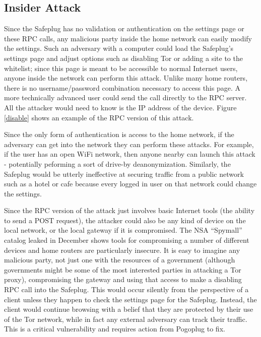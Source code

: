 \documentclass[conference]{IEEEtran}
\begin{document}
\subsection{Insider Attack}
Since the Safeplug has no validation or authentication on the settings page or these RPC calls, any malicious party inside the home network can easily modify the settings.  Such an adversary with a computer could load the Safeplug's settings page and adjust options such as disabling Tor or adding a site to the whitelist; since this page is meant to be accessible to normal Internet users, anyone inside the network can perform this attack.  Unlike many home routers, there is no username/password combination necessary to access this page.  A more technically advanced user could send the call directly to the RPC server.  All the attacker would need to know is the IP address of the device.  Figure \ref{disable} shows an example of the RPC version of this attack.

Since the only form of authentication is access to the home network, if the adversary can get into the network they can perform these attacks.  For example, if the user has an open WiFi network, then anyone nearby can launch this attack - potentially peforming a sort of drive-by deanonymization.  Similarly, the Safeplug would be utterly ineffective at securing traffic from a public network such as a hotel or cafe because every logged in user on that network could change the settings.

Since the RPC version of the attack just involves basic Internet tools (the ability to send a POST request), the attacker could also be any kind of device on the local network, or the local gateway if it is compromised.  The NSA ``Spymall'' catalog \cite{spymall} leaked in December shows tools for compromising a number of different devices and home routers are particularly insecure.  It is easy to imagine any malicious party, not just one with the resources of a government (although governments might be some of the most interested parties in attacking a Tor proxy), compromising the gateway and using that access to make a disabling RPC call into the Safeplug.  This would occur silently from the perspective of a client unless they happen to check the settings page for the Safeplug.  Instead, the client would continue browsing with a belief that they are protected by their use of the Tor network, while in fact any external adversary can track their traffic.  This is a critical vulnerability and requires action from Pogoplug to fix.  
\end{document}
